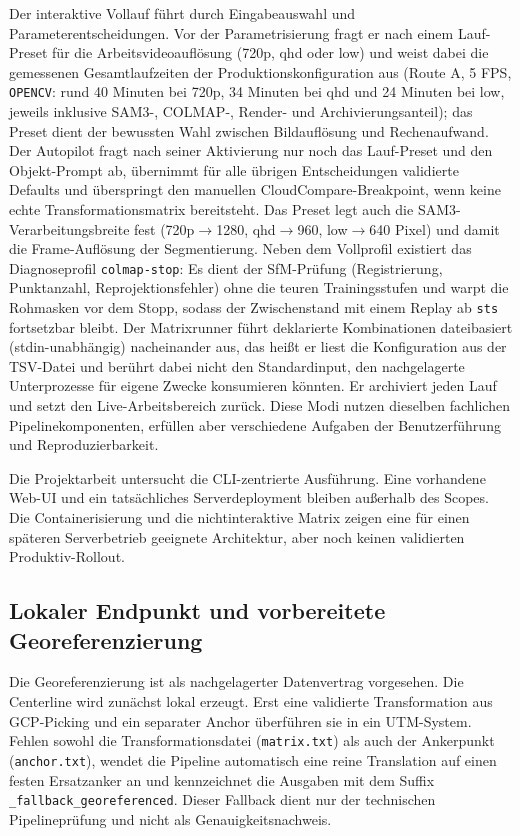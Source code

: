 Der interaktive Vollauf führt durch Eingabeauswahl und Parameterentscheidungen.
Vor der Parametrisierung fragt er nach einem Lauf-Preset für die
Arbeitsvideoauflösung (720p, qhd oder low) und weist dabei die gemessenen
Gesamtlaufzeiten der Produktionskonfiguration aus (Route A, 5 FPS,
\texttt{OPENCV}: rund 40 Minuten bei 720p, 34 Minuten bei qhd und 24 Minuten
bei low, jeweils inklusive SAM3-, COLMAP-, Render- und Archivierungsanteil);
das Preset dient der bewussten Wahl zwischen Bildauflösung und Rechenaufwand.
Der Autopilot fragt nach seiner Aktivierung nur noch das Lauf-Preset und den
Objekt-Prompt ab, übernimmt für alle übrigen Entscheidungen validierte
Defaults und überspringt den manuellen
CloudCompare-Breakpoint, wenn keine echte Transformationsmatrix bereitsteht.
Das Preset legt auch die SAM3-Verarbeitungsbreite fest (720p$\to$1280,
qhd$\to$960, low$\to$640 Pixel) und damit die Frame-Auflösung der
Segmentierung. Neben dem Vollprofil existiert das Diagnoseprofil
\texttt{colmap-stop}: Es dient der SfM-Prüfung (Registrierung, Punktanzahl,
Reprojektionsfehler) ohne die teuren Trainingsstufen und warpt die Rohmasken
vor dem Stopp, sodass der Zwischenstand mit einem Replay ab \texttt{sts}
fortsetzbar bleibt.
Der Matrixrunner führt deklarierte Kombinationen dateibasiert
(stdin-unabhängig) nacheinander aus, das heißt er liest die Konfiguration aus
der TSV-Datei und berührt dabei nicht den Standardinput, den nachgelagerte
Unterprozesse für eigene Zwecke konsumieren könnten. Er archiviert jeden Lauf
und setzt den Live-Arbeitsbereich zurück. Diese Modi nutzen dieselben
fachlichen Pipelinekomponenten, erfüllen aber verschiedene Aufgaben der
Benutzerführung und Reproduzierbarkeit.

Die Projektarbeit untersucht die CLI-zentrierte Ausführung. Eine vorhandene
Web-UI und ein tatsächliches Serverdeployment bleiben außerhalb des Scopes.
Die Containerisierung und die nichtinteraktive Matrix zeigen eine für einen
späteren Serverbetrieb geeignete Architektur, aber noch keinen validierten
Produktiv-Rollout.

\subsection{Lokaler Endpunkt und vorbereitete Georeferenzierung}

Die Georeferenzierung ist als nachgelagerter Datenvertrag vorgesehen. Die
Centerline wird zunächst lokal erzeugt. Erst eine validierte Transformation aus
GCP-Picking und ein separater Anchor überführen sie in ein UTM-System. Fehlen
sowohl die Transformationsdatei (\texttt{matrix.txt}) als auch der
Ankerpunkt (\texttt{anchor.txt}), wendet die Pipeline automatisch eine reine
Translation auf einen festen Ersatzanker an und kennzeichnet die Ausgaben mit
dem Suffix \texttt{\_fallback\_georeferenced}. Dieser Fallback dient nur der
technischen Pipelineprüfung und nicht als Genauigkeitsnachweis.
